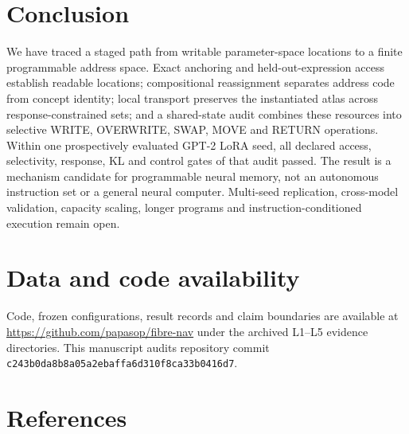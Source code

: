\documentclass[11pt]{article}
\begin{document}
\section{Conclusion}

We have traced a staged path from writable parameter-space locations to a finite programmable address space.
Exact anchoring and held-out-expression access establish readable locations; compositional reassignment
separates address code from concept identity; local transport preserves the instantiated atlas across
response-constrained sets; and a shared-state audit combines these resources into selective WRITE, OVERWRITE,
SWAP, MOVE and RETURN operations. Within one prospectively evaluated GPT-2 LoRA seed, all declared access,
selectivity, response, KL and control gates of that audit passed. The result is a mechanism candidate for
programmable neural memory, not an autonomous instruction set or a general neural computer. Multi-seed
replication, cross-model validation, capacity scaling, longer programs and instruction-conditioned execution
remain open.

\section*{Data and code availability}

\begingroup\sloppy
Code, frozen configurations, result records and claim boundaries are available
at \url{https://github.com/papasop/fibre-nav} under the archived L1--L5
evidence directories. This manuscript audits repository commit
\texttt{c243b0da8b8a05a2ebaffa6d310f8ca33b0416d7}.
\endgroup

\section*{References}
\end{document}
